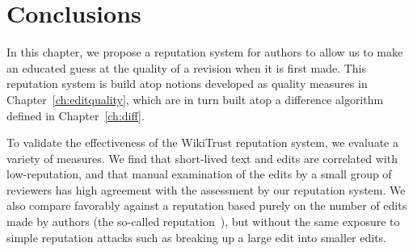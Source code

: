 \section{Conclusions}

In this chapter, we propose a reputation system for authors to allow us
to make an educated guess at the quality of a revision when it is first
made.
This reputation system is build atop notions developed as quality
measures in Chapter~\ref{ch:editquality}, which are in turn built atop a
difference algorithm defined in Chapter~\ref{ch:diff}.

To validate the effectiveness of the WikiTrust reputation system, we
evaluate a variety of measures.
We find that short-lived text and edits are correlated with low-reputation,
and that manual examination of the edits by a small group of reviewers
has high agreement with the assessment by our reputation system.
We also compare favorably against a reputation based purely on the
number of edits made by authors (the so-called 
reputation~\cite{Cross2006}), but without the same exposure to simple
reputation attacks such as breaking up a large edit into smaller edits.

